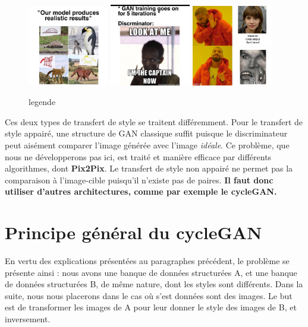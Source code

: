 \begin{figure}[!h]
\centering
\includegraphics[width=100pt]{"images/image_test"}
\includegraphics[width=100pt]{"images/image_test2"}
\includegraphics[width=100pt]{"images/image_test3"}
\caption{legende}
\end{figure}

Ces deux types de transfert de style se traitent différemment. Pour le transfert de style appairé, une structure de GAN classique suffit puisque le discriminateur peut aisément comparer l'image générée avec l'image \textit{idéale}. Ce problème, que nous ne développerons pas ici, est traité et manière efficace par différents algorithmes, dont \textbf{Pix2Pix}. Le transfert de style non appairé ne permet pas la comparaison à l'image-cible puisqu'il n'existe pas de paires. \textbf{Il faut donc utiliser d'autres architectures, comme par exemple le cycleGAN.}


\section{Principe général du cycleGAN}

En vertu des explications présentées au paragraphes précédent, le problème se présente ainsi : nous avons une banque de données structurées A, et une banque de données structurées B, de même nature, dont les styles sont différents. Dans la suite, nous nous placerons dans le cas où s'est données sont des images. Le but est de transformer les images de A pour leur donner le style des images de B, et inversement.

